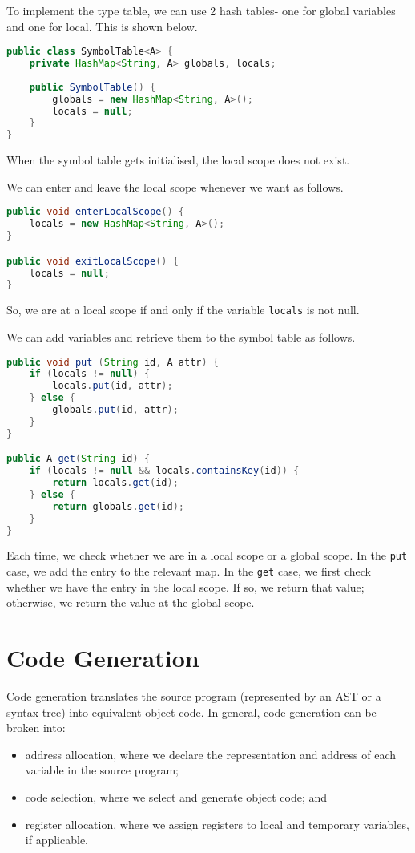 \documentclass[a4paper, openany]{memoir}
\begin{document}
To implement the type table, we can use 2 hash tables- one for global variables and one for local. This is shown below.
\begin{lstlisting}[language=java]
public class SymbolTable<A> {
    private HashMap<String, A> globals, locals;
    
    public SymbolTable() {
        globals = new HashMap<String, A>();
        locals = null;
    }
}
\end{lstlisting}
When the symbol table gets initialised, the local scope does not exist.

We can enter and leave the local scope whenever we want as follows.
\begin{lstlisting}[language=java]
public void enterLocalScope() {
    locals = new HashMap<String, A>();
}

public void exitLocalScope() {
    locals = null;
}
\end{lstlisting}
So, we are at a local scope if and only if the variable \texttt{locals} is not null.

We can add variables and retrieve them to the symbol table as follows.
\begin{lstlisting}[language=java]
public void put (String id, A attr) {
    if (locals != null) {
        locals.put(id, attr);
    } else {
        globals.put(id, attr);
    }
}

public A get(String id) {
    if (locals != null && locals.containsKey(id)) {
        return locals.get(id);
    } else {
        return globals.get(id);
    }
}
\end{lstlisting}
Each time, we check whether we are in a local scope or a global scope. In the \texttt{put} case, we add the entry to the relevant map. In the \texttt{get} case, we first check whether we have the entry in the local scope. If so, we return that value; otherwise, we return the value at the global scope.

\newpage

\section{Code Generation}
Code generation translates the source program (represented by an AST or a syntax tree) into equivalent object code. In general, code generation can be broken into:
\begin{itemize}
    \item address allocation, where we declare the representation and address of each variable in the source program;
    \item code selection, where we select and generate object code; and
    \item register allocation, where we assign registers to local and temporary variables, if applicable.
\end{itemize}
\end{document}
